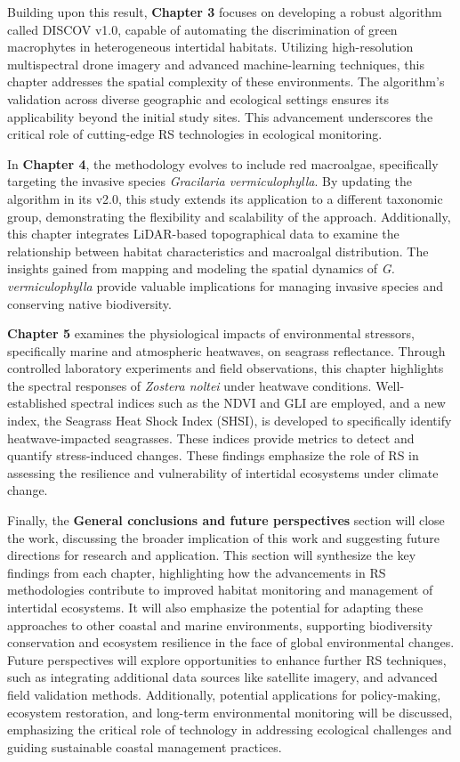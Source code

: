 \documentclass[
  letterpaper,
  11pt,
  english,
  singlespacing,
  headsepline]{MastersDoctoralThesis}
\begin{document}
\begin{spacing}{1.5}
Building upon this result, \textbf{Chapter 3} focuses on developing a
robust algorithm called DISCOV v1.0, capable of automating the
discrimination of green macrophytes in heterogeneous intertidal
habitats. Utilizing high-resolution multispectral drone imagery and
advanced machine-learning techniques, this chapter addresses the spatial
complexity of these environments. The algorithm's validation across
diverse geographic and ecological settings ensures its applicability
beyond the initial study sites. This advancement underscores the
critical role of cutting-edge RS technologies in ecological monitoring.

In \textbf{Chapter 4}, the methodology evolves to include red
macroalgae, specifically targeting the invasive species \emph{Gracilaria
vermiculophylla}. By updating the algorithm in its v2.0, this study
extends its application to a different taxonomic group, demonstrating
the flexibility and scalability of the approach. Additionally, this
chapter integrates LiDAR-based topographical data to examine the
relationship between habitat characteristics and macroalgal
distribution. The insights gained from mapping and modeling the spatial
dynamics of \emph{G. vermiculophylla} provide valuable implications for
managing invasive species and conserving native biodiversity.

\textbf{Chapter 5} examines the physiological impacts of environmental
stressors, specifically marine and atmospheric heatwaves, on seagrass
reflectance. Through controlled laboratory experiments and field
observations, this chapter highlights the spectral responses of
\emph{Zostera noltei} under heatwave conditions. Well-established
spectral indices such as the NDVI and GLI are employed, and a new index,
the Seagrass Heat Shock Index (SHSI), is developed to specifically
identify heatwave-impacted seagrasses. These indices provide metrics to
detect and quantify stress-induced changes. These findings emphasize the
role of RS in assessing the resilience and vulnerability of intertidal
ecosystems under climate change.

Finally, the \textbf{General conclusions and future perspectives}
section will close the work, discussing the broader implication of this
work and suggesting future directions for research and application. This
section will synthesize the key findings from each chapter, highlighting
how the advancements in RS methodologies contribute to improved habitat
monitoring and management of intertidal ecosystems. It will also
emphasize the potential for adapting these approaches to other coastal
and marine environments, supporting biodiversity conservation and
ecosystem resilience in the face of global environmental changes. Future
perspectives will explore opportunities to enhance further RS
techniques, such as integrating additional data sources like satellite
imagery, and advanced field validation methods. Additionally, potential
applications for policy-making, ecosystem restoration, and long-term
environmental monitoring will be discussed, emphasizing the critical
role of technology in addressing ecological challenges and guiding
sustainable coastal management practices.

\end{spacing}
\end{document}
